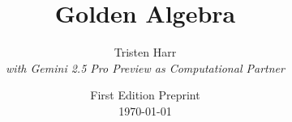 
\title{
    \vspace{2cm} %
    \Huge Golden Algebra
}

\author{
    Tristen Harr \\
    \vspace{0.4cm} %
    \large{\textit{with Gemini 2.5 Pro Preview as Computational Partner}}
}

\date{
    First Edition Preprint \\
    \today
}